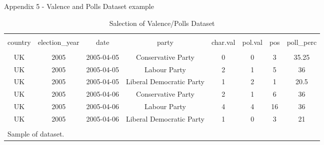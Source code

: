 \documentclass[9pt, aspectratio=169]{beamer}
\begin{document}
\begin{frame}{Appendix 5 - Valence and Polls Dataset example}
    \begin{table}[!htbp] \centering 
        \caption{Salection of Valence/Polls Dataset} 
        \label{tab:uk_election_preview} 
      \small 
      \begin{tabular}{cccccccc} 
      \\[-1.8ex]\hline 
      \hline \\[-1.8ex] 
      country & election\_year & date & party & char.val & pol.val & pos & poll\_perc \\ 
      \hline \\[-1.8ex] 
      UK & 2005 & 2005-04-05 & Conservative Party & 0 & 0 & 3 & 35.25 \\ 
      UK & 2005 & 2005-04-05 & Labour Party & 2 & 1 & 5 & 36 \\ 
      UK & 2005 & 2005-04-05 & Liberal Democratic Party & 1 & 2 & 1 & 20.5 \\ 
      UK & 2005 & 2005-04-06 & Conservative Party & 2 & 1 & 6 & 36 \\ 
      UK & 2005 & 2005-04-06 & Labour Party & 4 & 4 & 16 & 36 \\ 
      UK & 2005 & 2005-04-06 & Liberal Democratic Party & 1 & 0 & 3 & 21 \\ 
      \hline \\[-1.8ex] 
      \multicolumn{8}{l}{Sample of dataset.} \\ 
      \end{tabular} 
      \end{table} 
\end{frame}


  
\end{document}
